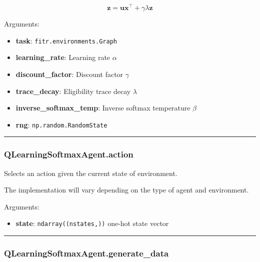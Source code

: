 \[
\mathbf z = \mathbf u \mathbf x^\top +  \gamma \lambda \mathbf z
\]

Arguments:

\begin{itemize}
\tightlist
\item
  \textbf{task}: \texttt{fitr.environments.Graph}
\item
  \textbf{learning\_rate}: Learning rate \(\alpha\)
\item
  \textbf{discount\_factor}: Discount factor \(\gamma\)
\item
  \textbf{trace\_decay}: Eligibility trace decay \(\lambda\)
\item
  \textbf{inverse\_softmax\_temp}: Inverse softmax temperature \(\beta\)
\item
  \textbf{rng}: \texttt{np.random.RandomState}
\end{itemize}

\begin{center}\rule{0.5\linewidth}{\linethickness}\end{center}

\subsubsection{QLearningSoftmaxAgent.action}\label{qlearningsoftmaxagent.action}

\begin{Shaded}
\begin{Highlighting}[]
\end{Highlighting}
\end{Shaded}

Selects an action given the current state of environment.

The implementation will vary depending on the type of agent and
environment.

Arguments:

\begin{itemize}
\tightlist
\item
  \textbf{state}: \texttt{ndarray((nstates,))} one-hot state vector
\end{itemize}

\begin{center}\rule{0.5\linewidth}{\linethickness}\end{center}

\subsubsection{QLearningSoftmaxAgent.generate\_data}\label{qlearningsoftmaxagent.generate_data}

